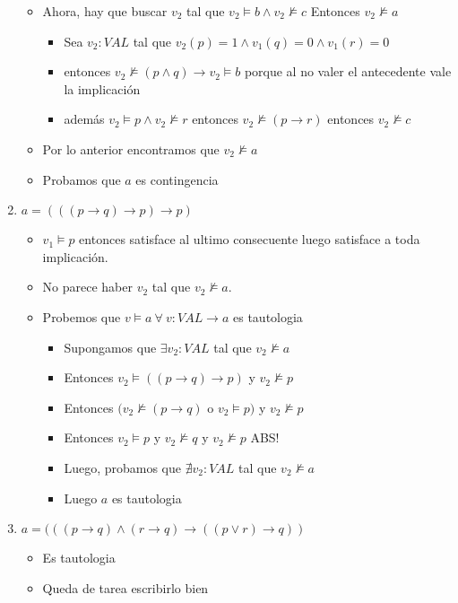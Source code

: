 \documentclass[14pt,a4paper,fleqn]{article}
\newcommand{\implica}[2]{(#1 \rightarrow #2)}
\newcommand{\entonces}{\rightarrow}
\newcommand{\satisface}{\vDash}
\newcommand{\nosatisf}{\nvDash}
\newcommand{\conj}[2]{(#1 \wedge #2)}
\begin{document}
\begin{enumerate}
\begin{itemize}
		\vspace{5pt}
		\item Ahora, hay que buscar $v_{2}$ tal que $v_{2} \satisface b \wedge v_{2} \nosatisf c$ Entonces $v_{2} \nosatisf a$
		\begin{itemize}
			\item Sea $v_{2}:VAL$ tal que  $v_{2}(p) = 1 \wedge v_{1}(q) = 0 \wedge v_{1}(r) = 0$
			\item entonces $v_{2} \nosatisf \conj p q \entonces v_{2} \satisface b$ porque al no valer el antecedente vale la implicación
			\item además $v_{2} \satisface p \wedge v_{2} \nosatisf r$ entonces $v_{2} \nosatisf \implica p r $ entonces $v_{2} \nosatisf c$
		\end{itemize}
		\item Por lo anterior encontramos que $v_{2} \nosatisf a$
		\vspace{5pt}		
		\item Probamos que $a$ es contingencia
	\end{itemize}
	\item $a=\implica{\implica{\implica{p}{q}}{p}}{p}$
	\begin{itemize}
		\item $v_{1} \satisface p $ entonces satisface al ultimo consecuente luego satisface a toda implicación.
		\item No parece haber $v_{2}$ tal que $v_{2} \nosatisf a$. 
		\item Probemos que $v \satisface a \: \forall \: v: VAL \entonces a $ es tautologia
		\vspace{5pt}
		\begin{itemize}
			\item Supongamos que $\exists v_{2}:VAL$ tal que $v_{2} \nosatisf a$
			\item Entonces $v_{2} \satisface \implica{\implica p q}{p}$ y $v_{2} \nosatisf p$
			\item Entonces $(v_{2} \nosatisf \implica p q $ o $v_{2} \satisface p )$ y $v_{2} \nosatisf p$
			\item Entonces $v_{2} \satisface p $ y $v_{2} \nosatisf q$ y $v_{2} \nosatisf p$ ABS!
			\item Luego, probamos que $\nexists v_{2} :VAL $ tal que $v_{2} \nosatisf a$
			\item Luego $a$ es tautologia
		\end{itemize}
	\end{itemize}
	\item $a=(((p \entonces q) \wedge (r \entonces q) \entonces ((p \vee r) \entonces q)) $
	\begin{itemize}
		\item Es tautologia
		\item Queda de tarea escribirlo bien
	\end{itemize}
\end{enumerate}
\newpage
\end{document}
